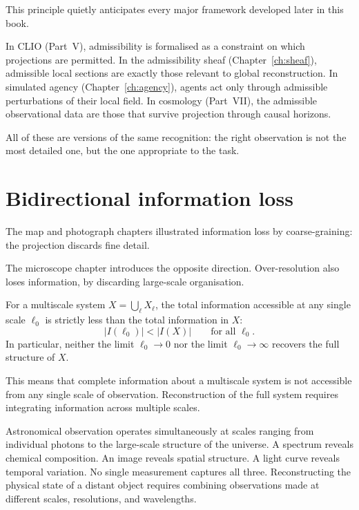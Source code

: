 
This principle quietly anticipates every major framework developed
later in this book.

In CLIO (Part~V), admissibility is formalised as a constraint on
which projections are permitted.
In the admissibility sheaf (Chapter~\ref{ch:sheaf}),
admissible local sections are exactly those relevant to global
reconstruction.
In simulated agency (Chapter~\ref{ch:agency}), agents act only
through admissible perturbations of their local field.
In cosmology (Part~VII), the admissible observational data are
those that survive projection through causal horizons.

All of these are versions of the same recognition: the right
observation is not the most detailed one, but the one
appropriate to the task.

\section{Bidirectional information loss}

The map and photograph chapters illustrated information loss by
coarse-graining: the projection discards fine detail.

The microscope chapter introduces the opposite direction.
Over-resolution also loses information, by discarding large-scale
organisation.

\begin{proposition}
  For a multiscale system $X = \bigcup_\ell X_\ell$, the
  total information accessible at any single scale $\ell_0$ is
  strictly less than the total information in $X$:
  \[
    |I(\ell_0)| < |I(X)|
    \qquad \text{for all } \ell_0.
  \]
  In particular, neither the limit $\ell_0 \to 0$ nor the limit
  $\ell_0 \to \infty$ recovers the full structure of $X$.
\end{proposition}

This means that complete information about a multiscale system is
not accessible from any single scale of observation.
Reconstruction of the full system requires integrating information
across multiple scales.

\begin{example}
  Astronomical observation operates simultaneously at scales
  ranging from individual photons to the large-scale structure
  of the universe.
  A spectrum reveals chemical composition.
  An image reveals spatial structure.
  A light curve reveals temporal variation.
  No single measurement captures all three.
  Reconstructing the physical state of a distant object requires
  combining observations made at different scales, resolutions,
  and wavelengths.
\end{example}

